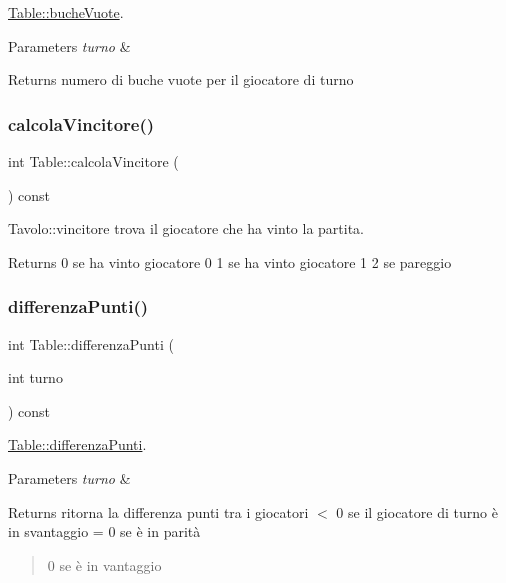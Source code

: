 \hyperlink{classTable_a6aa69eac7c388df315d1fc7af532cf38}{Table\+::buche\+Vuote}. 


\begin{DoxyParams}{Parameters}
{\em turno} & \\
\hline
\end{DoxyParams}
\begin{DoxyReturn}{Returns}
numero di buche vuote per il giocatore di turno 
\end{DoxyReturn}
\mbox{\label{classTable_a23f82e4f0607cb45c4fd834649ad2001}} 
\subsubsection{\texorpdfstring{calcola\+Vincitore()}{calcolaVincitore()}}
{\footnotesize\ttfamily int Table\+::calcola\+Vincitore (\begin{DoxyParamCaption}{ }\end{DoxyParamCaption}) const}



Tavolo\+::vincitore trova il giocatore che ha vinto la partita. 

\begin{DoxyReturn}{Returns}
0 se ha vinto giocatore 0 1 se ha vinto giocatore 1 2 se pareggio 
\end{DoxyReturn}
\mbox{\label{classTable_ade5ddf4ac9938a74db6b0d5bb8e9e29a}} 
\subsubsection{\texorpdfstring{differenza\+Punti()}{differenzaPunti()}}
{\footnotesize\ttfamily int Table\+::differenza\+Punti (\begin{DoxyParamCaption}\item[{int}]{turno }\end{DoxyParamCaption}) const}



\hyperlink{classTable_ade5ddf4ac9938a74db6b0d5bb8e9e29a}{Table\+::differenza\+Punti}. 


\begin{DoxyParams}{Parameters}
{\em turno} & \\
\hline
\end{DoxyParams}
\begin{DoxyReturn}{Returns}
ritorna la differenza punti tra i giocatori $<$ 0 se il giocatore di turno è in svantaggio = 0 se è in parità \begin{quote}
0 se è in vantaggio\end{quote}

\end{DoxyReturn}
\mbox{\label{classTable_ab011fd41be469dd6f67943a596bab4b0}} 
